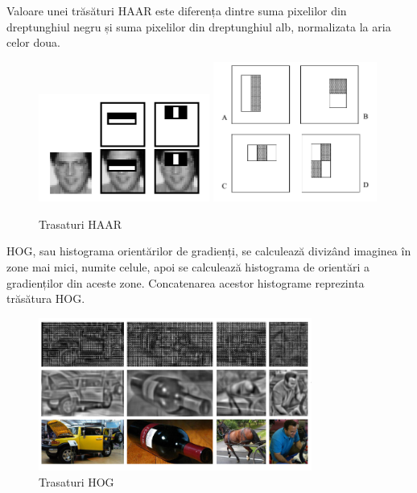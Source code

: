 Valoare unei trăsături HAAR este diferența dintre suma pixelilor din dreptunghiul negru și suma pixelilor din dreptunghiul alb, normalizata la aria celor doua.
\begin{figure}[H]
	\centering
		\includegraphics[width=0.50\textwidth]{imagini/haar0.png}
		\includegraphics[width=0.48\textwidth]{imagini/haar1.png}
	\caption{Trasaturi HAAR\footnotemark}
	\label{fig:haarfeatures}
\end{figure}

HOG, sau histograma orientărilor de gradienți, se calculează divizând imaginea în zone mai mici, numite celule, apoi se calculează histograma de orientări a gradienților din aceste zone. 
Concatenarea acestor histograme reprezinta trăsătura HOG.
\begin{figure}[H]
	\centering
		\includegraphics[width=0.80\textwidth]{imagini/hog0.png}
	\caption{Trasaturi HOG\footnotemark}
	\label{fig:hog0}
\end{figure}

